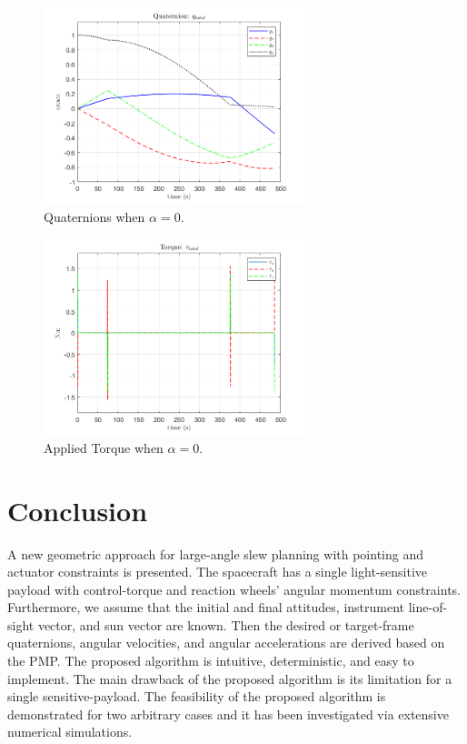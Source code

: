 \documentclass[letterpaper, preprint, paper,11pt]{AAS}	%
\begin{document}
		\begin{multicols}{2}
			\begin{figure}[H]
				\begin{center}
					\includegraphics[width=3in]{figures/alpha0/quats.png}
				\end{center}
				\caption{Quaternions when $\alpha=0$.}
				\label{fig:quats_phi_total_alpha0}
			\end{figure}
			\columnbreak
			\begin{figure}[H]
				\begin{center}
					\includegraphics[width=3in]{figures/alpha0/torque.png}
				\end{center}
				\caption{Applied Torque when $\alpha=0$.}
				\label{fig:torque_total_alpha0}
			\end{figure}
		\end{multicols}
			
			
	\section{Conclusion}
	 A new geometric approach for large-angle slew planning with pointing and actuator constraints is presented. The spacecraft has a single light-sensitive payload with control-torque and reaction wheels' angular momentum constraints. Furthermore, we assume that the initial and final attitudes, instrument line-of-sight vector, and sun vector are known. Then the desired or target-frame quaternions, angular velocities, and angular accelerations are derived based on the PMP.  The proposed algorithm is intuitive, deterministic, and easy to implement. The main drawback of the proposed algorithm is its limitation for a single sensitive-payload. The feasibility of the proposed algorithm is demonstrated for two arbitrary cases and it has been investigated via extensive numerical simulations.
\end{document}
